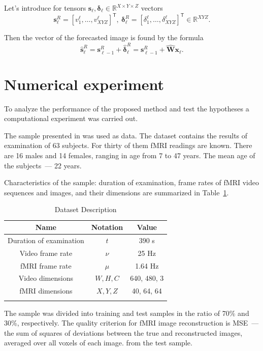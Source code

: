 \documentclass[sn-mathphys-num]{sn-jnl}%
\theoremstyle{thmstyleone}%
\theoremstyle{thmstyletwo}%
\theoremstyle{thmstylethree}%
\newcommand{\T}{^{\mathsf{T}}}
\begin{document}
Let's introduce for tensors $\mathbf{s}_{\ell}, \boldsymbol{\delta}_{\ell} \in \mathbb{R}^{X \times Y \times Z}$ vectors
\[ \mathbf{s}_{\ell}^{R} = [ v^{\ell}_1, \ldots, v^{\ell}_{XYZ} ]\T,\
	\boldsymbol{\delta}_{\ell}^{R} = [ \delta^{\ell}_1, \ldots, \delta^{\ell}_{XYZ} ]\T \in \mathbb{R}^{XYZ}. \]

Then the vector of the forecasted image is found by the formula
\begin{equation*}
	\label{eq14}
	\hat{\mathbf{s}}_{\ell}^{R} = \mathbf{s}_{\ell-1}^{R} + \hat{\boldsymbol{\delta}}_{\ell}^{R} = \mathbf{s}_{\ell-1}^{R} + \hat{\mathbf{W}} \mathbf{x}_{\ell}.
\end{equation*}

\section{Numerical experiment}

To analyze the performance of the proposed method and test the hypotheses a computational experiment was carried out.

The sample presented in \cite{Berezutskaya2022} was used as data.
The dataset contains the results of examination of 63 subjects.
For thirty of them fMRI readings are known.
There are 16 males and 14 females, ranging in age from 7 to 47 years.
The mean age of the subjects~--- 22 years.

Characteristics of the sample: duration of examination,
frame rates of fMRI video sequences and images, and their dimensions are summarized in Table~\ref{table:sample}.

\begin{table}[h!]
\caption{Dataset Description}\label{table:sample}
\begin{tabular}{@{}ccc@{}}
\toprule
Name & Notation & Value \\ 
\midrule
Duration of examination & $t$ & 390 s \\
Video frame rate & $\nu$ & 25 Hz \\
fMRI frame rate & $\mu$ & 1.64 Hz \\
Video dimensions & $W, H, C$ & 640, 480, 3 \\
fMRI dimensions & $X, Y, Z$ & 40, 64, 64 \\
\botrule
\end{tabular}
\end{table}

The sample was divided into training and test samples in the ratio of 70\% and 30\%, respectively.
The quality criterion for fMRI image reconstruction is MSE~--- the sum of squares of deviations
between the true and reconstructed images, averaged over all voxels of each image.
from the test sample.
\end{document}

